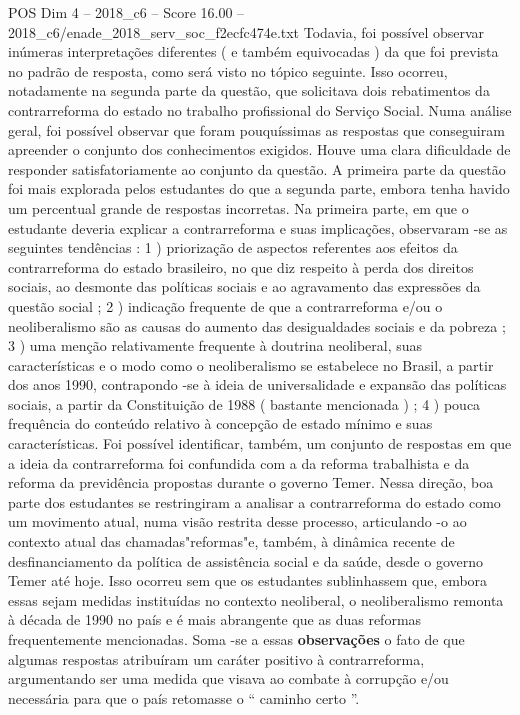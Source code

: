 \begin{textsample}{POS Dim 4 – 2018\_c6 – Score 16.00 – 2018\_c6/enade\_2018\_serv\_soc\_f2ecfc474e.txt}
Todavia, foi possível observar inúmeras interpretações diferentes ( e também equivocadas ) da que foi prevista no padrão de resposta, como será visto no tópico seguinte.
Isso ocorreu, notadamente na segunda parte da questão, que solicitava dois rebatimentos da contrarreforma do estado no trabalho profissional do Serviço Social.
Numa análise geral, foi possível observar que foram pouquíssimas as respostas que conseguiram apreender o conjunto dos conhecimentos exigidos.
Houve uma clara dificuldade de responder satisfatoriamente ao conjunto da questão.
A primeira parte da questão foi mais explorada pelos estudantes do que a segunda parte, embora tenha havido um percentual grande de respostas incorretas.
Na primeira parte, em que o estudante deveria explicar a contrarreforma e suas implicações, observaram -se as seguintes tendências : 1 ) priorização de aspectos referentes aos efeitos da contrarreforma do estado brasileiro, no que diz respeito à perda dos direitos sociais, ao desmonte das políticas sociais e ao agravamento das expressões da questão social ; 2 ) indicação frequente de que a contrarreforma e/ou o neoliberalismo são as causas do aumento das desigualdades sociais e da pobreza ; 3 ) uma menção relativamente frequente à doutrina neoliberal, suas características e o modo como o neoliberalismo se estabelece no Brasil, a partir dos anos 1990, contrapondo -se à ideia de universalidade e expansão das políticas sociais, a partir da Constituição de 1988 ( bastante mencionada ) ; 4 ) pouca frequência do conteúdo relativo à concepção de estado mínimo e suas características.
Foi possível identificar, também, um conjunto de respostas em que a ideia da contrarreforma foi confundida com a da reforma trabalhista e da reforma da previdência propostas durante o governo Temer.
Nessa direção, boa parte dos estudantes se restringiram a analisar a contrarreforma do estado como um movimento atual, numa visão restrita desse processo, articulando -o ao contexto atual das chamadas"reformas"e, também, à dinâmica recente de desfinanciamento da política de assistência social e da saúde, desde o governo Temer até hoje.
Isso ocorreu sem que os estudantes sublinhassem que, embora essas sejam medidas instituídas no contexto neoliberal, o neoliberalismo remonta à década de 1990 no país e é mais abrangente que as duas reformas frequentemente mencionadas.
Soma -se a essas \textbf{observações} o fato de que algumas respostas atribuíram um caráter positivo à contrarreforma, argumentando ser uma medida que visava ao combate à corrupção e/ou necessária para que o país retomasse o “ caminho certo ”.

\end{textsample}
